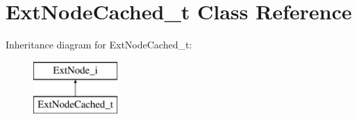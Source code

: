 \hypertarget{classExtNodeCached__t}{\section{Ext\-Node\-Cached\-\_\-t Class Reference}
\label{classExtNodeCached__t}
}
Inheritance diagram for Ext\-Node\-Cached\-\_\-t\-:\begin{figure}[H]
\begin{center}
\leavevmode
\includegraphics[height=2.000000cm]{classExtNodeCached__t}
\end{center}
\end{figure}
